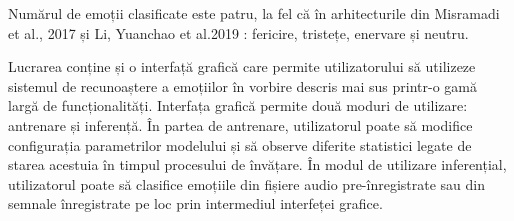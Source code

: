 \documentclass[a4paper,12pt]{book}
\begin{document}
					Numărul de emoții clasificate este patru, la fel că în arhitecturile din Misramadi et al., 2017 \cite{misramadi} și	Li, Yuanchao et al.2019 \cite{yuan}: fericire, tristețe, enervare și neutru. \par
					
					Lucrarea conține și o interfață grafică care permite utilizatorului să utilizeze sistemul de recunoaștere a emoțiilor în vorbire descris mai sus printr-o gamă largă de funcționalități. Interfața grafică permite două moduri de utilizare: antrenare și inferență. În partea de antrenare, utilizatorul poate să modifice configurația parametrilor modelului și să observe diferite statistici legate de starea acestuia în timpul procesului de învățare. În modul de utilizare inferențial, utilizatorul poate să clasifice emoțiile din fișiere audio pre-înregistrate sau din semnale înregistrate pe loc prin intermediul interfeței grafice.\par			
							
\end{document}
